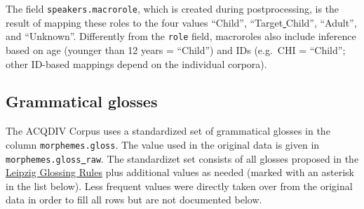 \documentclass[a4paper, 11pt]{book}
\newcommand{\und}{\underline{{ }}\hspace{0.2mm}}	%
\begin{document}
The field \texttt{speakers.macrorole}, which is created during postprocessing, is the result of mapping these roles to the four values “Child”, “Target\und Child”, “Adult”, and “Unknown”. Differently from the \texttt{role} field, macroroles also include inference based on age (younger than 12 years = “Child”) and IDs (e.g.\ CHI = “Child”; other ID-based mappings depend on the individual corpora). 


\subsection{Grammatical glosses}
\label{subsec:Grammatical glosses}

The ACQDIV Corpus uses a standardized set of grammatical glosses in the column \texttt{morphemes.gloss}. The value used in the original data is given in \texttt{morphemes.gloss\und raw}. The standardizet set consists of all glosses proposed in the \href{http://www.eva.mpg.de/lingua/resources/glossing-rules.php}{Leipzig Glossing Rules} plus additional values as needed (marked with an asterisk in the list below). Less frequent values were directly taken over from the original data in order to fill all rows but are not documented below. 
\end{document}
